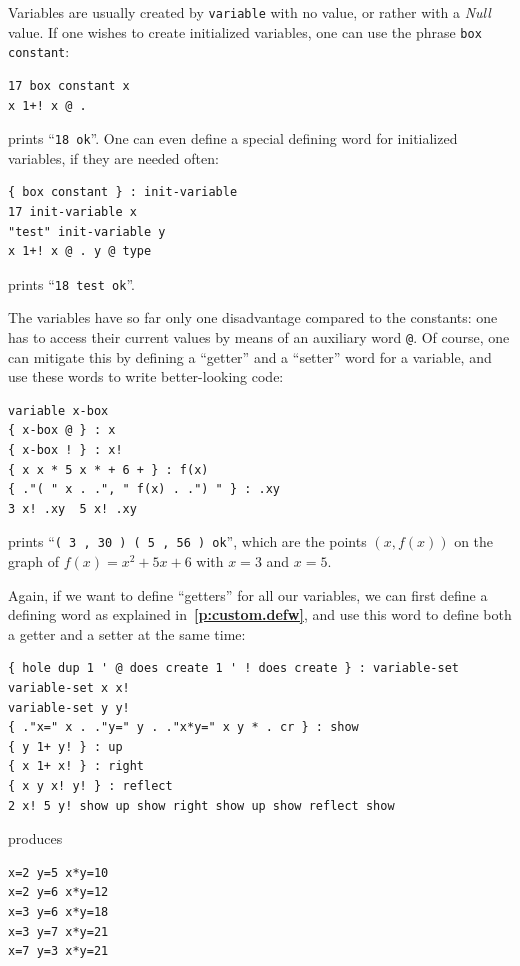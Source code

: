 \documentclass[12pt,oneside]{article}
\def\refpoint#1{{\rm\textbf{\ref{#1}}}}
\let\ptref=\refpoint
\begin{document}
Variables are usually created by {\tt variable} with no value, or rather with a {\em Null\/} value. If one wishes to create initialized variables, one can use the phrase {\tt box constant}:
\begin{verbatim}
17 box constant x
x 1+! x @ .
\end{verbatim}
prints ``{\tt 18 ok}''. One can even define a special defining word for initialized variables, if they are needed often:
\begin{verbatim}
{ box constant } : init-variable
17 init-variable x
"test" init-variable y
x 1+! x @ . y @ type
\end{verbatim}
prints ``{\tt 18 test ok}''.

The variables have so far only one disadvantage compared to the constants: one has to access their current values by means of an auxiliary word {\tt @}. Of course, one can mitigate this by defining a ``getter'' and a ``setter'' word for a variable, and use these words to write better-looking code:
\begin{verbatim}
variable x-box
{ x-box @ } : x
{ x-box ! } : x!
{ x x * 5 x * + 6 + } : f(x)
{ ."( " x . .", " f(x) . .") " } : .xy
3 x! .xy  5 x! .xy
\end{verbatim}
prints ``{\tt ( 3 , 30 ) ( 5 , 56 ) ok}'', which are the points $(x,f(x))$ on the graph of $f(x)=x^2+5x+6$ with $x=3$ and $x=5$.

Again, if we want to define ``getters'' for all our variables, we can first define a defining word as explained in~\ptref{p:custom.defw}, and use this word to define both a getter and a setter at the same time:
\begin{verbatim}
{ hole dup 1 ' @ does create 1 ' ! does create } : variable-set
variable-set x x!
variable-set y y!
{ ."x=" x . ."y=" y . ."x*y=" x y * . cr } : show
{ y 1+ y! } : up
{ x 1+ x! } : right
{ x y x! y! } : reflect
2 x! 5 y! show up show right show up show reflect show
\end{verbatim}
produces
\begin{verbatim}
x=2 y=5 x*y=10
x=2 y=6 x*y=12
x=3 y=6 x*y=18
x=3 y=7 x*y=21
x=7 y=3 x*y=21
\end{verbatim}
\end{document}
